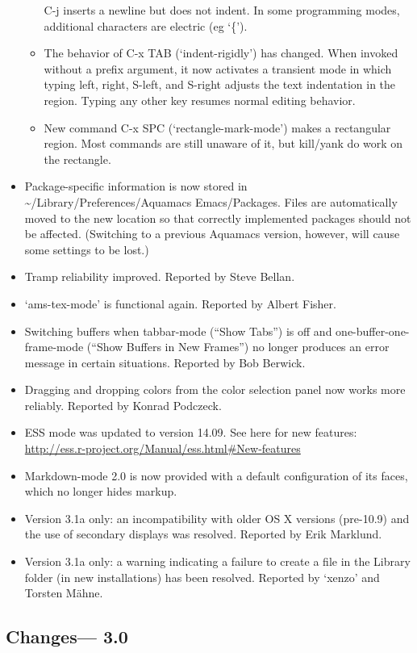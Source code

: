 \begin{itemize}
\begin{itemize}
C-j inserts a newline but does not indent.  In some programming modes,
additional characters are electric (eg `\{').
\item The behavior of C-x TAB (`indent-rigidly') has changed.
When invoked without a prefix argument, it now activates a transient
mode in which typing left, right, S-left, and S-right adjusts
the text indentation in the region.  Typing any other key resumes
normal editing behavior.
\item New command C-x SPC (`rectangle-mark-mode') makes a rectangular region.
Most commands are still unaware of it, but kill/yank do work on the rectangle.
\end{itemize}
\item Package-specific information is now stored in {\textasciitilde{}}/Library/Preferences/Aquamacs Emacs/Packages.  Files are automatically moved to the new location so that correctly implemented packages should not be affected.  (Switching to a previous Aquamacs version, however, will cause some settings to be lost.)
\item Tramp reliability improved.
Reported by Steve Bellan.
\item `ams-tex-mode' is functional again.
Reported by Albert Fisher.
\item Switching buffers when tabbar-mode (``Show Tabs'') is off and one-buffer-one-frame-mode (``Show Buffers in New Frames'') no longer produces an error message in certain situations.
Reported by Bob Berwick.
\item Dragging and dropping colors from the color selection panel now works more reliably.
Reported by Konrad Podczeck.
\item ESS mode was updated to version 14.09. See here for new features: \url{http://ess.r-project.org/Manual/ess.html#New-features}
\item Markdown-mode 2.0 is now provided with a default configuration of its faces, which no longer hides markup.
\item Version 3.1a only: an incompatibility with older OS X versions (pre-10.9) and the use of secondary displays was resolved.
Reported by Erik Marklund.
\item Version 3.1a only: a warning indicating a failure to create a file in the Library folder (in new installations) has been resolved.
Reported by `xenzo' and Torsten M\"ahne.
\end{itemize}

\subsection{Changes--- 3.0}


